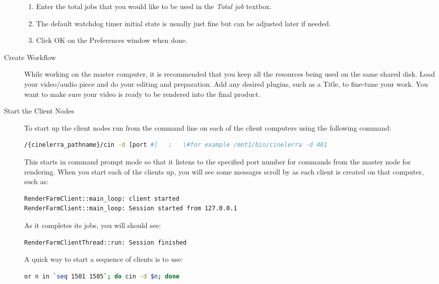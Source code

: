 \begin{description}
\begin{enumerate}
        \item Enter the total jobs that you would like to be used in the \textit{Total job} textbox.
        \item The default watchdog timer initial state is usually just fine but can be adjusted later if needed.
        \item Click OK on the Preferences window when done.
    \end{enumerate}
    \item[Create Workflow] While working on the master computer, it is recommended that you keep all the resources being used on the same shared disk.  Load your video/audio piece and do your editing and preparation.  Add any desired plugins, such as a Title, to fine-tune your work.  You want to make sure your video is ready to be rendered into the final product.
    \item[Start the Client Nodes] To start up the client nodes run \CGG{} from the command line on each of the client computers using the following command:
    \begin{lstlisting}[language=bash,numbers=none]
/{cinelerra_pathname}/cin -d [port #]   ;   \#for example /mnt1/bin/cinelerra -d 401
    \end{lstlisting}
    This starts \CGG{} in command prompt mode so that it listens to the specified port number for commands from the master node for rendering.  When you start each of the clients up, you will see some messages scroll by as each client is created on that computer, such as:
    \begin{lstlisting}[language=bash,numbers=none]
RenderFarmClient::main_loop: client started
RenderFarmClient::main_loop: Session started from 127.0.0.1
    \end{lstlisting}
    As it completes its jobs, you will should see:
    \begin{lstlisting}[language=bash,numbers=none]
RenderFarmClientThread::run: Session finished
    \end{lstlisting}
    A quick way to start a sequence of clients is to use:
    \begin{lstlisting}[language=bash,numbers=none]
or n in `seq 1501 1505`; do cin -d $n; done
    \end{lstlisting}

\end{description}
